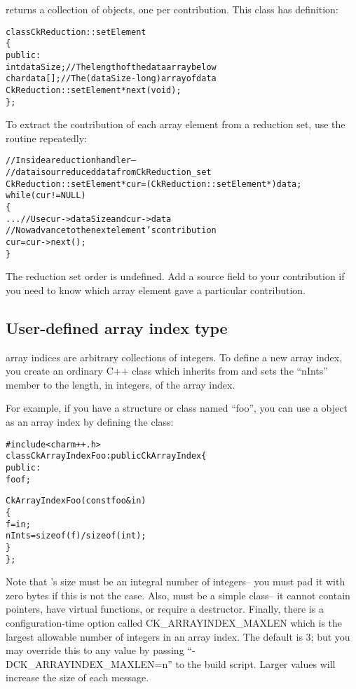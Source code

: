  returns a collection of 
objects, one per contribution.  This class has definition:

\begin{alltt}
class CkReduction::setElement 
\{
public:
  int dataSize;//The length of the data array below
  char data[];//The (dataSize-long) array of data
  CkReduction::setElement *next(void);
\};
\end{alltt}

To extract the contribution of each array element from a reduction set, use the
 routine repeatedly:

\begin{alltt}
  //Inside a reduction handler-- 
  //  data is our reduced data from CkReduction_set
  CkReduction::setElement *cur=(CkReduction::setElement *)data;
  while (cur!=NULL)
  \{
    ... //Use cur->dataSize and cur->data
    //Now advance to the next element's contribution
    cur=cur->next();
  \}
\end{alltt}

The reduction set order is undefined.  Add a source field to your contribution
if you need to know which array element gave a particular contribution.



\subsection{User-defined array index type}

\charmpp{} array indices are arbitrary collections of integers.
To define a new array index, you create an ordinary C++ class 
which inherits from  and sets the ``nInts'' member
to the length, in integers, of the array index.

For example, if you have a structure or class named ``foo'', you 
can use a  object as an array index by defining the class:

\begin{alltt}
#include <charm++.h>
class CkArrayIndexFoo:public CkArrayIndex \{
public:
    foo f;

    CkArrayIndexFoo(const foo \&in) 
	\{
		f=in;
		nInts=sizeof(f)/sizeof(int);
	\}
\};
\end{alltt}

Note that 's size must be an integral number of integers--
you must pad it with zero bytes if this is not the case.
Also,  must be a simple class-- it cannot contain 
pointers, have virtual functions, or require a destructor.
Finally, there is a \charmpp configuration-time option called
CK\_ARRAYINDEX\_MAXLEN  
which is the largest allowable number of 
integers in an array index.  The default is 3; but you may 
override this to any value by passing ``-DCK\_ARRAYINDEX\_MAXLEN=n'' 
to the \charmpp build script. Larger values will increase the
size of each message.

